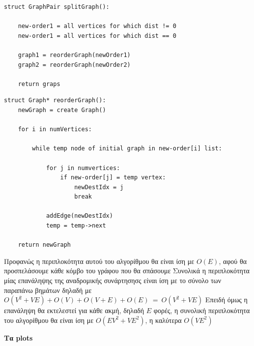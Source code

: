 \documentclass{article}
\begin{document}
\begin{lstlisting}
struct GraphPair splitGraph():

	new-order1 = all vertices for which dist != 0
	new-order1 = all vertices for which dist == 0

  	graph1 = reorderGraph(newOrder1)
  	graph2 = reorderGraph(newOrder2)
  
	return graps

\end{lstlisting}
\begin{lstlisting}
struct Graph* reorderGraph():
	newGraph = create Graph()

	for i in numVertices:

		while temp node of initial graph in new-order[i] list: 
			
			for j in numvertices:
				if new-order[j] = temp vertex:
					newDestIdx = j
					break

			addEdge(newDestIdx)
			temp = temp->next

	return newGraph

\end{lstlisting}\bigbreak{}

Προφανώς η περιπλοκότητα αυτού του αλγορίθμου θα είναι ίση με $O(E)$, αφού θα προσπελάσουμε κάθε κόμβο του γράφου που θα σπάσουμε
Συνολικά η περιπλοκότητα μίας επανάληψης της αναδρομικής συνάρτησησς είναι ίση με το σύνολο των παραπάνω βημάτων δηλαδή με
$O(V^2 + VE) + O(V) + O(V + E) + O(E) \ = \ O(V^2 + VE)$ Επειδή όμως η επανάληψη θα εκτελεστεί για κάθε ακμή, δηλαδή $E$ φορές,
η συνολική περιπλοκότητα του αλγορίθμου θα είναι ίση με $O(ΕV^2 + VE^2)$, η καλύτερα $O(VE^2)$\bigbreak

\textbf{Τα plots}\bigbreak
\end{document}

